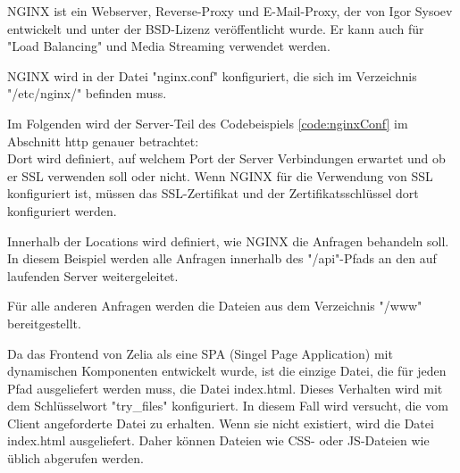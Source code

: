 

NGINX ist ein Webserver, Reverse-Proxy und E-Mail-Proxy, der von Igor Sysoev entwickelt und unter der BSD-Lizenz veröffentlicht wurde. Er kann auch für "Load Balancing" und Media Streaming verwendet werden.
\cite{WikiNginx}
\cite{nginx}

NGINX wird in der Datei "nginx.conf" konfiguriert, die sich im Verzeichnis \linebreak \mbox{\ttfamily "/etc/nginx/"} befinden muss. 


Im Folgenden wird der Server-Teil des Codebeispiels \ref{code:nginxConf} im Abschnitt http genauer betrachtet: \\
Dort wird definiert, auf welchem Port der Server Verbindungen erwartet und ob er SSL verwenden soll oder nicht. Wenn NGINX für die Verwendung von SSL konfiguriert ist, müssen das SSL-Zertifikat und der Zertifikatsschlüssel dort konfiguriert werden.

Innerhalb der Locations wird definiert, wie NGINX die Anfragen behandeln soll. In diesem Beispiel werden alle Anfragen innerhalb des {\ttfamily "/api"}-Pfads an den auf  laufenden Server weitergeleitet.

Für alle anderen Anfragen werden die Dateien aus dem Verzeichnis {\ttfamily "/www"} bereitgestellt. 

Da das Frontend von Zelia als eine SPA (Singel Page Application) mit dynamischen Komponenten entwickelt wurde, ist die einzige Datei, die für jeden Pfad ausgeliefert werden muss, die Datei {\ttfamily index.html}. Dieses Verhalten wird mit dem Schlüsselwort {\ttfamily "try\_files"} konfiguriert. In diesem Fall wird versucht, die vom Client angeforderte Datei zu erhalten. Wenn sie nicht existiert, wird die Datei index.html ausgeliefert. Daher können Dateien wie CSS- oder JS-Dateien wie üblich abgerufen werden.

